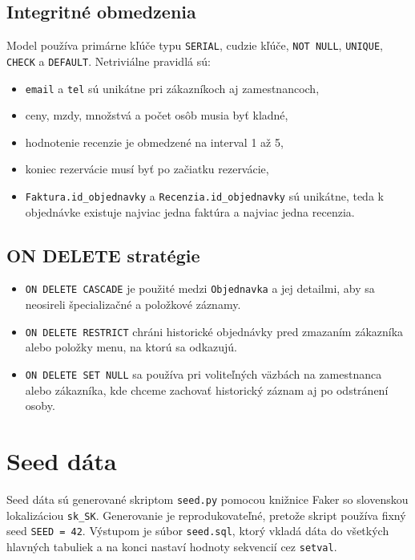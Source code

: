 \documentclass[11pt, a4paper]{article}
\begin{document}
\subsection*{Integritné obmedzenia}

Model používa primárne kľúče typu \texttt{SERIAL}, cudzie kľúče, \texttt{NOT NULL},
\texttt{UNIQUE}, \texttt{CHECK} a \texttt{DEFAULT}. Netriviálne pravidlá sú:
\begin{itemize}
    \item \texttt{email} a \texttt{tel} sú unikátne pri zákazníkoch aj zamestnancoch,
    \item ceny, mzdy, množstvá a počet osôb musia byť kladné,
    \item hodnotenie recenzie je obmedzené na interval 1 až 5,
    \item koniec rezervácie musí byť po začiatku rezervácie,
    \item \texttt{Faktura.id\_objednavky} a \texttt{Recenzia.id\_objednavky} sú unikátne, teda k objednávke existuje najviac jedna faktúra a najviac jedna recenzia.
\end{itemize}

\subsection*{ON DELETE stratégie}

\begin{itemize}
    \item \texttt{ON DELETE CASCADE} je použité medzi \texttt{Objednavka} a jej detailmi, aby sa neosireli špecializačné a položkové záznamy.
    \item \texttt{ON DELETE RESTRICT} chráni historické objednávky pred zmazaním zákazníka alebo položky menu, na ktorú sa odkazujú.
    \item \texttt{ON DELETE SET NULL} sa používa pri voliteľných väzbách na zamestnanca alebo zákazníka, kde chceme zachovať historický záznam aj po odstránení osoby.
\end{itemize}

\section{Seed dáta}

Seed dáta sú generované skriptom \texttt{seed.py} pomocou knižnice Faker so slovenskou lokalizáciou
\texttt{sk\_SK}. Generovanie je reprodukovateľné, pretože skript používa fixný seed
\texttt{SEED = 42}. Výstupom je súbor \texttt{seed.sql}, ktorý vkladá dáta do všetkých hlavných tabuliek
a na konci nastaví hodnoty sekvencií cez \texttt{setval}.
\end{document}
